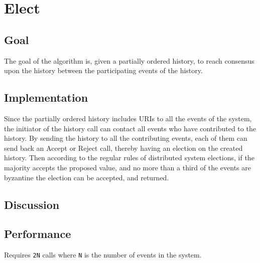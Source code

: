 \section{Elect}
\subsection{Goal} %
The goal of the algorithm is, given a partially ordered history, to reach consensus upon the history between the participating events of the history.

\subsection{Implementation}
Since the partially ordered history includes URIs to all the events of the system, the initiator of the history call can contact all events who have contributed to the history. By sending the history to all the contributing events, each of them can send back an Accept or Reject call, thereby having an election on the created history. Then according to the regular rules of distributed system elections, if the majority accepts the proposed value, and no more than a third of the events are byzantine the election can be accepted, and returned.

\subsection{Discussion} %
\subsection{Performance}
Requires \texttt{2N} calls where \texttt{N} is the number of events in the system.

